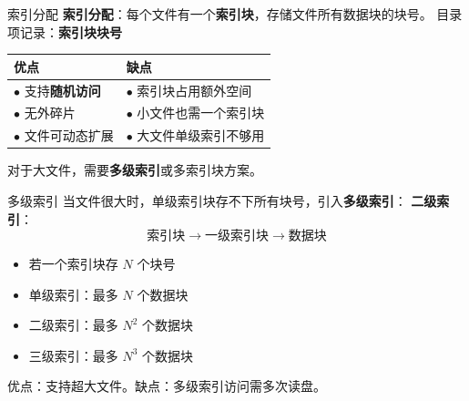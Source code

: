 \documentclass[10pt, aspectratio=169]{beamer}
\begin{document}
\begin{frame}{索引分配}
    \textbf{索引分配}：每个文件有一个\textbf{索引块}，存储文件所有数据块的块号。
    \vspace{0.5em}
    目录项记录：\textbf{索引块块号}
    \vspace{0.5em}
    \begin{center}
        \begin{tabular}{|l|l|}
            \hline
            \textbf{优点} & \textbf{缺点} \\
            \hline
            $\bullet$ 支持\textbf{随机访问} & $\bullet$ 索引块占用额外空间 \\
            $\bullet$ 无外碎片 & $\bullet$ 小文件也需一个索引块 \\
            $\bullet$ 文件可动态扩展 & $\bullet$ 大文件单级索引不够用 \\
            \hline
        \end{tabular}
    \end{center}
    \vspace{0.5em}
    对于大文件，需要\textbf{多级索引}或多索引块方案。
\end{frame}

\begin{frame}{多级索引}
    当文件很大时，单级索引块存不下所有块号，引入\textbf{多级索引}：
    \vspace{0.5em}
    \textbf{二级索引}：
    \[
    \text{索引块} \rightarrow \text{一级索引块} \rightarrow \text{数据块}
    \]
    \vspace{0.5em}
    \begin{itemize}
        \item 若一个索引块存 $N$ 个块号
        \item 单级索引：最多 $N$ 个数据块
        \item 二级索引：最多 $N^2$ 个数据块
        \item 三级索引：最多 $N^3$ 个数据块
    \end{itemize}
    \vspace{0.5em}
    优点：支持超大文件。缺点：多级索引访问需多次读盘。
\end{frame}
\end{document}
